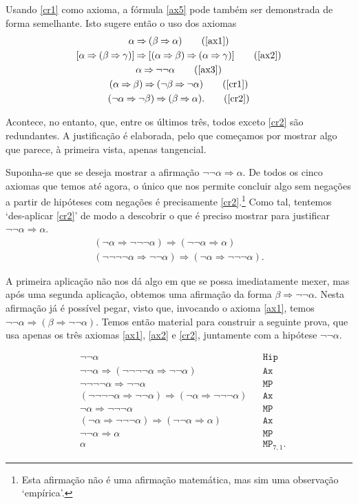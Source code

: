 \documentclass{report}
\theoremstyle{definition}
\theoremstyle{remark}
\newcommand{\imply}{\mathbin{\Rightarrow}}
\begin{document}
	Usando \eqref{cr1} como axioma, a fórmula \eqref{ax5} pode também ser demonstrada de forma semelhante. Isto sugere então o uso dos axiomas
	\begin{gather}
	\alpha \imply (\beta \imply \alpha) \tag{\ref{ax1}}\\
	[\alpha \imply (\beta \imply \gamma)] \imply [(\alpha \imply \beta) \imply (\alpha \imply \gamma)]\tag{\ref{ax2}}\\
	\alpha \imply \neg \neg \alpha \tag{\ref{ax3}}\\
	(\alpha \imply \beta) \imply (\neg \beta \imply \neg \alpha)\tag{\ref{cr1}}\\
	(\neg \alpha \imply \neg \beta) \imply (\beta \imply \alpha).\tag{\ref{cr2}}
	\end{gather}
	
	Acontece, no entanto, que, entre os últimos três, todos exceto \eqref{cr2} são redundantes. A justificação é elaborada, pelo que começamos por mostrar algo que parece, à primeira vista, apenas tangencial.
	
	Suponha-se que se deseja mostrar a afirmação $\neg \neg \alpha \imply \alpha$. De todos os cinco axiomas que temos até agora, o único que nos permite concluir algo sem negações a partir de hipóteses com negações é precisamente \eqref{cr2}.\footnote{Esta afirmação não é uma afirmação matemática, mas sim uma observação `empírica'.} Como tal, tentemos `des-aplicar \eqref{cr2}' de modo a descobrir o que é preciso mostrar para justificar $\neg\neg\alpha \imply \alpha$.
	\begin{gather*}
	(\neg\alpha \imply \neg\neg\neg\alpha) \imply (\neg\neg\alpha \imply \alpha)\\
	(\neg\neg\neg\neg\alpha \imply \neg\neg\alpha) \imply (\neg\alpha \imply \neg\neg\neg\alpha).
	\end{gather*}
	
	A primeira aplicação não nos dá algo em que se possa imediatamente mexer, mas após uma segunda aplicação, obtemos uma afirmação da forma $\beta \imply \neg\neg\alpha$. Nesta afirmação já é possível pegar, visto que, invocando o axioma \eqref{ax1}, temos $\neg\neg\alpha \imply (\beta \imply \neg\neg\alpha)$. Temos então material para construir a seguinte prova, que usa apenas os três axiomas \eqref{ax1}, \eqref{ax2} e \eqref{cr2}, juntamente com a hipótese $\neg\neg\alpha$.
	
	\begin{align*}
	&\neg\neg\alpha&&\texttt{Hip}\\
	&\neg\neg\alpha \imply (\neg\neg\neg\neg \alpha \imply \neg\neg\alpha)&&\texttt{Ax}\\
	&\neg\neg\neg\neg \alpha \imply \neg\neg\alpha&&\texttt{MP}\\
	&(\neg\neg\neg\neg \alpha \imply \neg\neg\alpha) \imply (\neg\alpha \imply \neg\neg\neg\alpha)&&\texttt{Ax}\\
	&\neg\alpha \imply \neg\neg\neg\alpha&&\texttt{MP}\\
	&(\neg\alpha \imply \neg\neg\neg\alpha)\imply(\neg\neg\alpha \imply \alpha)&&\texttt{Ax}\\
	&\neg\neg\alpha \imply \alpha&&\texttt{MP}\\
	&\alpha&&\texttt{MP}_{7,1}.
	\end{align*}
	
\end{document}
